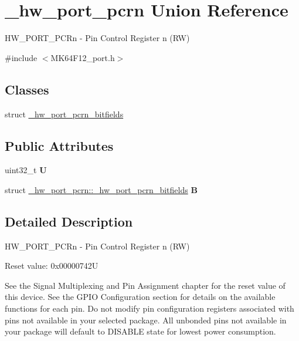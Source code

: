 \hypertarget{union__hw__port__pcrn}{}\section{\+\_\+hw\+\_\+port\+\_\+pcrn Union Reference}
\label{union__hw__port__pcrn}


H\+W\+\_\+\+P\+O\+R\+T\+\_\+\+P\+C\+Rn -\/ Pin Control Register n (RW)  




{\ttfamily \#include $<$M\+K64\+F12\+\_\+port.\+h$>$}

\subsection*{Classes}
\begin{DoxyCompactItemize}
\item 
struct \hyperlink{struct__hw__port__pcrn_1_1__hw__port__pcrn__bitfields}{\+\_\+hw\+\_\+port\+\_\+pcrn\+\_\+bitfields}
\end{DoxyCompactItemize}
\subsection*{Public Attributes}
\begin{DoxyCompactItemize}
\item 
uint32\+\_\+t {\bfseries U}\hypertarget{union__hw__port__pcrn_a83d778c49c7c62900c08d8eae870f27b}{}\label{union__hw__port__pcrn_a83d778c49c7c62900c08d8eae870f27b}

\item 
struct \hyperlink{struct__hw__port__pcrn_1_1__hw__port__pcrn__bitfields}{\+\_\+hw\+\_\+port\+\_\+pcrn\+::\+\_\+hw\+\_\+port\+\_\+pcrn\+\_\+bitfields} {\bfseries B}\hypertarget{union__hw__port__pcrn_a0a30b16100f43945f3d6d6911d9a7614}{}\label{union__hw__port__pcrn_a0a30b16100f43945f3d6d6911d9a7614}

\end{DoxyCompactItemize}


\subsection{Detailed Description}
H\+W\+\_\+\+P\+O\+R\+T\+\_\+\+P\+C\+Rn -\/ Pin Control Register n (RW) 

Reset value\+: 0x00000742U

See the Signal Multiplexing and Pin Assignment chapter for the reset value of this device. See the G\+P\+IO Configuration section for details on the available functions for each pin. Do not modify pin configuration registers associated with pins not available in your selected package. All unbonded pins not available in your package will default to D\+I\+S\+A\+B\+LE state for lowest power consumption. 

